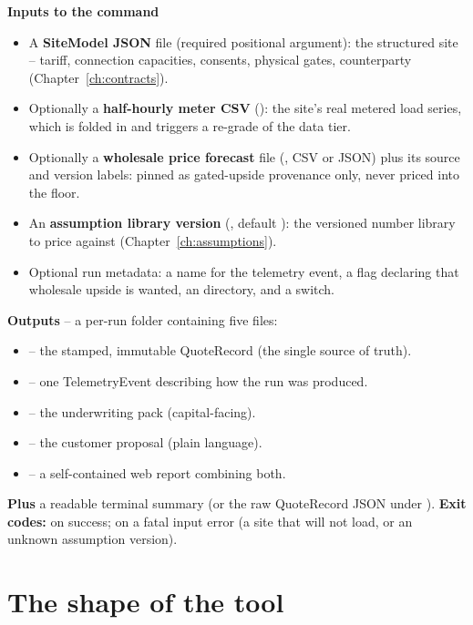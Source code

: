 \begin{contract}
\textbf{Inputs to the  command}
\begin{itemize}
  \item A \textbf{SiteModel JSON} file (required positional argument): the structured site -- tariff, connection capacities, consents, physical gates, counterparty (Chapter~\ref{ch:contracts}).
  \item Optionally a \textbf{half-hourly meter CSV} (): the site's real metered load series, which is folded in and triggers a re-grade of the data tier.
  \item Optionally a \textbf{wholesale price forecast} file (, CSV or JSON) plus its source and version labels: pinned as gated-upside provenance only, never priced into the floor.
  \item An \textbf{assumption library version} (, default ): the versioned number library to price against (Chapter~\ref{ch:assumptions}).
  \item Optional run metadata: a  name for the telemetry event, a  flag declaring that wholesale upside is wanted, an  directory, and a  switch.
\end{itemize}
\textbf{Outputs} -- a per-run folder containing five files:
\begin{itemize}
  \item {} -- the stamped, immutable QuoteRecord (the single source of truth).
  \item {} -- one TelemetryEvent describing how the run was produced.
  \item {} -- the underwriting pack (capital-facing).
  \item {} -- the customer proposal (plain language).
  \item {} -- a self-contained web report combining both.
\end{itemize}
\textbf{Plus} a readable terminal summary (or the raw QuoteRecord JSON under ). \textbf{Exit codes:}  on success;  on a fatal input error (a site that will not load, or an unknown assumption version).
\end{contract}

\section{The shape of the tool}

